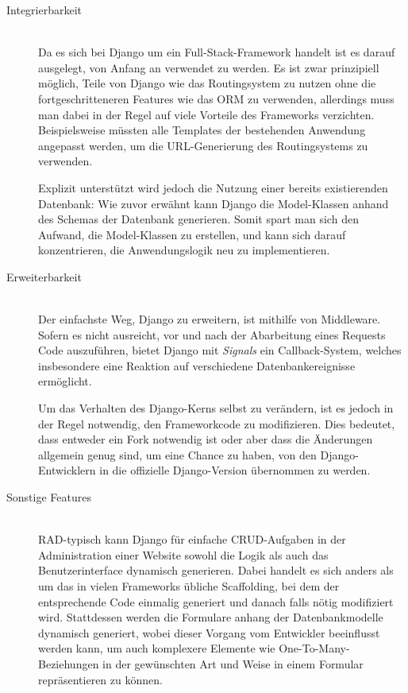 \begin{description}
\item[Integrierbarkeit] \hfill \\
Da es sich bei Django um ein Full-Stack-Framework handelt ist es darauf ausgelegt, von Anfang an
verwendet zu werden. Es ist zwar prinzipiell möglich, Teile von Django wie das Routingsystem zu
nutzen ohne die fortgeschritteneren Features wie das ORM zu verwenden, allerdings muss man dabei in
der Regel auf viele Vorteile des Frameworks verzichten. Beispielsweise müssten alle Templates der
bestehenden Anwendung angepasst werden, um die URL-Generierung des Routingsystems zu verwenden.

Explizit unterstützt wird jedoch die Nutzung einer bereits existierenden Datenbank: Wie zuvor
erwähnt kann Django die Model-Klassen anhand des Schemas der Datenbank generieren. Somit spart man
sich den Aufwand, die Model-Klassen zu erstellen, und kann sich darauf konzentrieren, die
Anwendungslogik neu zu implementieren.


\item[Erweiterbarkeit] \hfill \\
Der einfachste Weg, Django zu erweitern, ist mithilfe von Middleware. Sofern es nicht ausreicht,
vor und nach der Abarbeitung eines Requests Code auszuführen, bietet Django mit \emph{Signals} ein
Callback-System, welches insbesondere eine Reaktion auf verschiedene Datenbankereignisse ermöglicht.

Um das Verhalten des Django-Kerns selbst zu verändern, ist es jedoch in der Regel notwendig, den
Frameworkcode zu modifizieren. Dies bedeutet, dass entweder ein Fork notwendig ist oder aber dass
die Änderungen allgemein genug sind, um eine Chance zu haben, von den Django-Entwicklern in die
offizielle Django-Version übernommen zu werden.


\item[Sonstige Features] \hfill \\
RAD-typisch kann Django für einfache CRUD-Aufgaben in der Administration einer Website sowohl die
Logik als auch das Benutzerinterface dynamisch generieren. Dabei handelt es sich anders als um das
in vielen Frameworks übliche Scaffolding, bei dem der entsprechende Code einmalig generiert und
danach falls nötig modifiziert wird. Stattdessen werden die Formulare anhang der Datenbankmodelle
dynamisch generiert, wobei dieser Vorgang vom Entwickler beeinflusst werden kann, um auch komplexere
Elemente wie One-To-Many-Beziehungen in der gewünschten Art und Weise in einem Formular
repräsentieren zu können.


\end{description}
